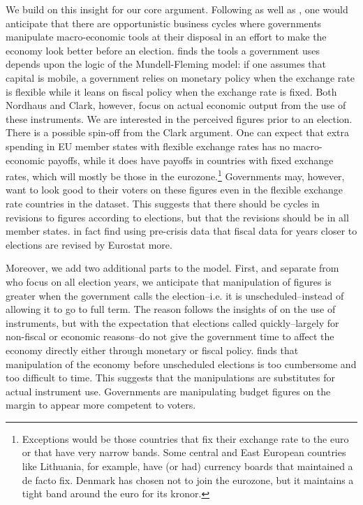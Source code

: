 \documentclass[]{article}
\begin{document}
We build on this insight for our core argument. Following \cite{nordhaus1975} as well as \cite{Alt2014}, one would anticipate that there are opportunistic business cycles where governments manipulate macro-economic tools at their disposal in an effort to make the economy look better before an election. \cite{clark2003} finds the tools a government uses depends upon the logic of the Mundell-Fleming model: if one assumes that capital is mobile, a government relies on monetary policy when the exchange rate is flexible while it leans on fiscal policy when the exchange rate is fixed. Both Nordhaus and Clark, however, focus on actual economic output from the use of these instruments. We are interested in the perceived figures prior to an election. There is a possible spin-off from the Clark argument. One can expect that extra spending in EU member states with flexible exchange rates has no macro-economic payoffs, while it does have payoffs in countries with fixed exchange rates, which will mostly be those in the eurozone.\footnote{Exceptions would be those countries that fix their exchange rate to the euro or that have very narrow bands. Some central and East European countries like Lithuania, for example, have (or had) currency boards that maintained a de facto fix. Denmark has chosen not to join the eurozone, but it maintains a tight band around the euro for its kronor.} Governments may, however, want to look good to their voters on these figures even in the flexible exchange rate countries in the dataset. This suggests that there should be cycles in revisions to figures according to elections, but that the revisions should be in all member states. \cite{DeCastro2013} in fact find using pre-crisis data that fiscal data for years closer to elections are revised by Eurostat more.

Moreover, we add two additional parts to the model. First, and separate from \cite{Alt2014} who focus on all election years, we anticipate that manipulation of figures is greater when the government calls the election--i.e. it is unscheduled--instead of allowing it to go to full term. The reason follows the insights of \cite{clark2003} on the use of instruments, but with the expectation that elections called quickly--largely for non-fiscal or economic reasons--do not give the government time to affect the economy directly either through monetary or fiscal policy. \cite{Kayser2005} finds that manipulation of the economy before unscheduled elections is too cumbersome and too difficult to time. This suggests that the manipulations are substitutes for actual instrument use. Governments are manipulating budget figures on the margin to appear more competent to voters.
\end{document}
